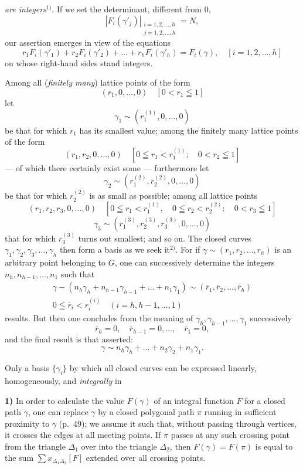\documentclass{article}
\begin{document}
\emph{are integers}${}^{1)}$. If we set the determinant, different from $0$,
\[ |F_i(\gamma'_j)|_{\substack{i = 1, 2, \dots, h \\ j = 1, 2, \dots, h}} = N, \]
our assertion emerges in view of the equations
\[ r_1 F_i(\gamma'_1) + r_2 F_i(\gamma'_2) + \dots + r_h F_i(\gamma'_h) = F_i(\gamma), \quad [i = 1, 2, \dots, h] \]
on whose right-hand sides stand integers.

Among all (\emph{finitely many}) lattice points of the form
\[ (r_1, 0, \dots, 0) \quad [0 < r_1 \leqq 1] \]
let
\[ \gamma_1 \sim (r_1^{(1)}, 0, \dots, 0) \]
be that for which $r_1$ has its smallest value; among the finitely many lattice points of the form
\[ (r_1, r_2, 0, \dots, 0) \quad [0 \leqq r_1 < r_1^{(1)}; \quad 0 < r_2 \leqq 1] \]
--- of which there certainly exist some --- furthermore let
\[ \gamma_2 \sim (r_1^{(2)}, r_2^{(2)}, 0, \dots, 0) \]
be that for which $r_2^{(2)}$ is as small as possible; among all lattice points
\[ (r_1, r_2, r_3, 0, \dots, 0) \quad [0 \leqq r_1 < r_1^{(1)}, \quad 0 \leqq r_2 < r_2^{(2)}; \quad 0 < r_3 \leqq 1] \]
\[ \gamma_3 \sim (r_1^{(3)}, r_2^{(3)}, r_3^{(3)}, 0, \dots, 0) \]
that for which $r_3^{(3)}$ turns out smallest; and so on. The closed curves $\gamma_1, \gamma_2, \gamma_3, \dots, \gamma_h$ then form a basis as we seek it${}^{2)}$. For if $\gamma \sim (r_1, r_2, \dots, r_h)$ is an arbitrary point belonging to $G$, one can successively determine the integers $n_h, n_{h-1}, \dots, n_1$ such that
\[ \begin{gathered} \gamma - (n_h \gamma_h + n_{h-1} \gamma_{h-1} + \dots + n_1 \gamma_1) \sim (\bar{r}_1, \bar{r}_2, \dots, \bar{r}_h) \\ 0 \leqq \bar{r}_i < r_i^{(i)} \quad (i = h, h - 1, \dots, 1) \end{gathered} \]
results. But then one concludes from the meaning of $\gamma_h, \gamma_{h-1}, \dots, \gamma_1$ successively
\[ \bar{r}_h = 0, \quad \bar{r}_{h-1} = 0, \dots, \quad \bar{r}_1 = 0, \]
and the final result is that asserted:
\[ \gamma \sim n_h \gamma_h + \dots + n_2 \gamma_2 + n_1 \gamma_1. \]

Only a basis $\{\gamma_i\}$ by which all closed curves can be expressed linearly, homogeneously, and \emph{integrally} in

\textbf{1)} In order to calculate the value $F(\gamma)$ of an integral function $F$ for a closed path $\gamma$, one can replace $\gamma$ by a closed polygonal path $\pi$ running in sufficient proximity to $\gamma$ (p.~49); we assume it such that, without passing through vertices, it crosses the edges at all meeting points. If $\pi$ passes at any such crossing point from the triangle $\Delta_1$ over into the triangle $\Delta_2$, then $F(\gamma) = F(\pi)$ is equal to the sum $\displaystyle\sum x_{\Delta_1 \Delta_2} [F]$ extended over all crossing points.
\end{document}
